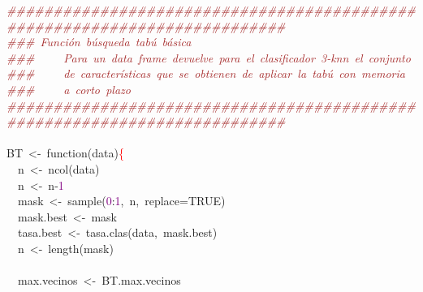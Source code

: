 \noindent
\mbox{}\textit{\textcolor{Brown}{\#\#\#\#\#\#\#\#\#\#\#\#\#\#\#\#\#\#\#\#\#\#\#\#\#\#\#\#\#\#\#\#\#\#\#\#\#\#\#\#\#\#\#\#\#\#\#\#\#\#\#\#\#\#\#\#\#\#\#\#\#\#\#\#\#\#\#\#\#\#\#\#\#\#}} \\
\mbox{}\textit{\textcolor{Brown}{\#\#\#\ Función\ búsqueda\ tabú\ básica}} \\
\mbox{}\textit{\textcolor{Brown}{\#\#\#\ \ \ \ \ Para\ un\ data\ frame\ devuelve\ para\ el\ clasificador\ 3-knn\ el\ conjunto}} \\
\mbox{}\textit{\textcolor{Brown}{\#\#\#\ \ \ \ \ de\ características\ que\ se\ obtienen\ de\ aplicar\ la\ tabú\ con\ memoria}} \\
\mbox{}\textit{\textcolor{Brown}{\#\#\#\ \ \ \ \ a\ corto\ plazo}} \\
\mbox{}\textit{\textcolor{Brown}{\#\#\#\#\#\#\#\#\#\#\#\#\#\#\#\#\#\#\#\#\#\#\#\#\#\#\#\#\#\#\#\#\#\#\#\#\#\#\#\#\#\#\#\#\#\#\#\#\#\#\#\#\#\#\#\#\#\#\#\#\#\#\#\#\#\#\#\#\#\#\#\#\#\#}} \\
\mbox{} \\
\mbox{}BT\ \textcolor{BrickRed}{\textless{}-}\ function\textcolor{BrickRed}{(}data\textcolor{BrickRed}{)}\textcolor{Red}{\{} \\
\mbox{}\ \ n\ \textcolor{BrickRed}{\textless{}-}\ ncol\textcolor{BrickRed}{(}data\textcolor{BrickRed}{)} \\
\mbox{}\ \ n\ \textcolor{BrickRed}{\textless{}-}\ n\textcolor{BrickRed}{-}\textcolor{Purple}{1} \\
\mbox{}\ \ mask\ \textcolor{BrickRed}{\textless{}-}\ sample\textcolor{BrickRed}{(}\textcolor{Purple}{0}\textcolor{BrickRed}{:}\textcolor{Purple}{1}\textcolor{BrickRed}{,}\ n\textcolor{BrickRed}{,}\ replace\textcolor{BrickRed}{=}TRUE\textcolor{BrickRed}{)} \\
\mbox{}\ \ mask\textcolor{BrickRed}{.}best\ \textcolor{BrickRed}{\textless{}-}\ mask \\
\mbox{}\ \ tasa\textcolor{BrickRed}{.}best\ \textcolor{BrickRed}{\textless{}-}\ tasa\textcolor{BrickRed}{.}clas\textcolor{BrickRed}{(}data\textcolor{BrickRed}{,}\ mask\textcolor{BrickRed}{.}best\textcolor{BrickRed}{)} \\
\mbox{}\ \ n\ \textcolor{BrickRed}{\textless{}-}\ length\textcolor{BrickRed}{(}mask\textcolor{BrickRed}{)} \\
\mbox{}\ \  \\
\mbox{}\ \ max\textcolor{BrickRed}{.}vecinos\ \textcolor{BrickRed}{\textless{}-}\ BT\textcolor{BrickRed}{.}max\textcolor{BrickRed}{.}vecinos \\
